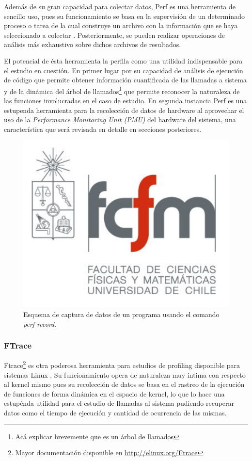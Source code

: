Además de su gran capacidad para colectar datos, Perf es una herramienta de sencillo uso, pues su funcionamiento se basa en la supervisión de un determinado proceso o tarea de la cual construye un archivo con la información que se haya seleccionado a colectar \cite{article:perf}. Posteriormente, se pueden realizar operaciones de análisis más exhaustivo sobre dichos archivos de resultados.

El potencial de ésta herramienta la perfila como una utilidad indispensable para el estudio en cuestión. En primer lugar por su capacidad de análisis de ejecución de código que permite obtener información cuantificada de las llamadas a sistema y de la dinámica del árbol de llamados\footnote{Acá explicar brevemente que es un árbol de llamados} que permite reconocer la naturaleza de las funciones involucradas en el caso de estudio. En segunda instancia Perf es una estupenda herramienta para la recolección de datos de hardware al aprovechar el uso de la \emph{Performance Monitoring Unit (PMU)} del hardware del sistema, una característica que será revisada en detalle en secciones posteriores.

\begin{figure}[!h]
	\centering
	\includegraphics[scale=.3]{imagenes/fcfm}
	\caption{Esquema de captura de datos de un programa usando el comando \emph{perf-record}.}
	\label{fig:perfRecord}
\end{figure}

\subsubsection{FTrace}
Ftrace\footnote{Mayor documentación disponible en \url{http://elinux.org/Ftrace}} es otra poderosa herramienta para estudios de profiling disponible para sistemas Linux \cite{paper:FTraceSony}. Su funcionamiento opera de naturaleza muy intima con respecto al kernel mismo pues su recolección de datos se basa en el rastreo de la ejecución de funciones de forma dinámica en el espacio de kernel, lo que lo hace una estupénda utilidad para el estudio de llamadas al sistema pudiendo recuperar datos como el tiempo de ejecución y cantidad de ocurrencia de las mismas.

